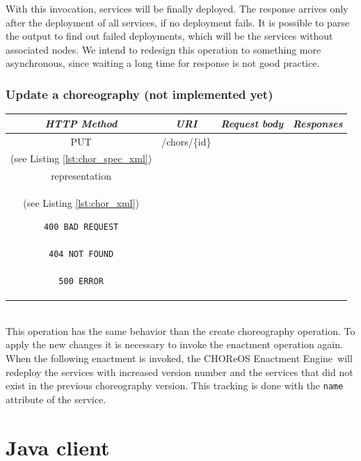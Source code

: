 \documentclass[a4paper, 10pt]{article}
\newcommand{\ee}{CHOReOS Enactment Engine}
\begin{document}
With this invocation, services will be finally deployed.
The response arrives only after the deployment of all services, if no deployment fails.
It is possible to parse the output to find out failed deployments, which will be the services without associated nodes.
We intend to redesign this operation to something more asynchronous, since waiting a long time for response is not good practice.

\subsubsection*{Update a choreography (not implemented yet)}

\begin{tabular}{|c|c|c|c|}
\hline 
\itshape{HTTP Method} & \itshape{URI} & \itshape{Request body} & \itshape{Responses} \\ 
\hline 
PUT & /chors/\{id\} & 

\begin{minipage}{2in}
\verb!ChorSpec! XML representation \\ 
(see Listing \ref{lst:chor_spec_xml})
\end{minipage} 
&
\begin{minipage}{2in}
\begin{verbatim}

200 OK
location = "/chors/{id}"
Body: 
\end{verbatim}
\verb!Choreography! XML \\
representation \\
(see Listing \ref{lst:chor_xml})
\begin{verbatim}
400 BAD REQUEST

404 NOT FOUND

500 ERROR

\end{verbatim}
\end{minipage} 
\\ 
\hline 
\end{tabular} \\

This operation has the same behavior than the create choreography operation.
To apply the new changes it is necessary to invoke the enactment operation again.
When the following enactment is invoked, the \ee\ will redeploy the services with increased version number and the services that did not exist in the previous choreography version. This tracking is done with the \texttt{name} attribute of the service.

\section{Java client}
\label{sec:client}
\end{document}
